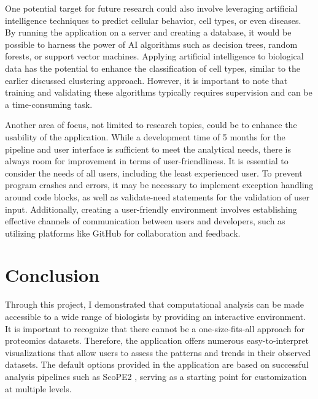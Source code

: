 \documentclass[
  11pt,
]{article}
\begin{document}
One potential target for future research could also involve leveraging artificial intelligence techniques to predict cellular behavior, cell types, or even diseases. By running the application on a server and creating a database, it would be possible to harness the power of AI algorithms such as decision trees, random forests, or support vector machines. Applying artificial intelligence to biological data has the potential to enhance the classification of cell types, similar to the earlier discussed clustering approach. However, it is important to note that training and validating these algorithms typically requires supervision and can be a time-consuming task.

Another area of focus, not limited to research topics, could be to enhance the usability of the application. While a development time of 5 months for the pipeline and user interface is sufficient to meet the analytical needs, there is always room for improvement in terms of user-friendliness. It is essential to consider the needs of all users, including the least experienced user. To prevent program crashes and errors, it may be necessary to implement exception handling around code blocks, as well as validate-need statements for the validation of user input. Additionally, creating a user-friendly environment involves establishing effective channels of communication between users and developers, such as utilizing platforms like GitHub for collaboration and feedback.

\newpage

\hypertarget{conclusion}{%
\section{Conclusion}\label{conclusion}}

Through this project, I demonstrated that computational analysis can be made accessible to a wide range of biologists by providing an interactive environment. It is important to recognize that there cannot be a one-size-fits-all approach for proteomics datasets. Therefore, the application offers numerous easy-to-interpret visualizations that allow users to assess the patterns and trends in their observed datasets. The default options provided in the application are based on successful analysis pipelines such as ScoPE2 \citep{Specht2021}, serving as a starting point for customization at multiple levels.
\end{document}

